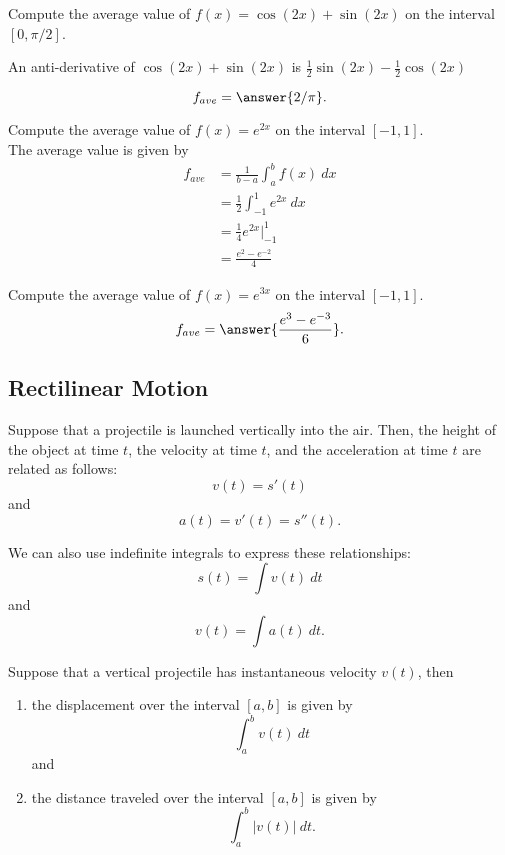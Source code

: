 \documentclass{ximera}
\begin{document}
\begin{problem}
Compute the average value of $f(x) = \cos(2x) + \sin(2x)$ on the interval $[0,\pi/2]$.
\begin{hint}
An anti-derivative of $\cos(2x) + \sin(2x)$ is  $\tfrac12\sin(2x) - \tfrac12\cos(2x)$
\end{hint}
\[f_{ave} = \answer{2/\pi}.\]
\end{problem} 


\begin{example}
Compute the average value of $f(x) = e^{2x}$ on the interval $[-1,1]$.\\
The average value is given by 
\begin{align*}
f_{ave} &= \frac{1}{b-a}\int_a^b f(x) \ dx \\
 & = \frac12\int_{-1}^1 e^{2x} \ dx \\
 & = \frac14 e^{2x} \Bigg|_{-1}^1 \\
  & = \frac{e^2 - e^{-2}}{4}
\end{align*}
\end{example}


\begin{problem}
Compute the average value of $f(x) = e^{3x}$ on the interval $[-1,1]$.
\[f_{ave} = \answer{\frac{e^{3} - e^{-3}}{6}}.\]
\end{problem} 


\subsection{Rectilinear Motion}

Suppose that a projectile is launched vertically into the air.
Then, the height of the object at time $t$, the velocity at time $t$, and the acceleration at time $t$ are related as follows:
\[v(t) = s'(t)\]
and
\[a(t) = v'(t) = s''(t).\]

We can also use indefinite integrals to express these relationships:
\[s(t) = \int v(t) \ dt\]
and
\[v(t) = \int a(t) \ dt.\]

\begin{proposition}
Suppose that a vertical projectile has instantaneous velocity $v(t)$, then
\begin{enumerate}
\item the displacement over the interval $[a,b]$ is given by 
\[\int_a^b v(t) \ dt\]
and
\item the distance traveled over the interval $[a,b]$ is given by 
\[\int_a^b |v(t)| \ dt.\]
\end{enumerate}
\end{proposition}
\end{document}
